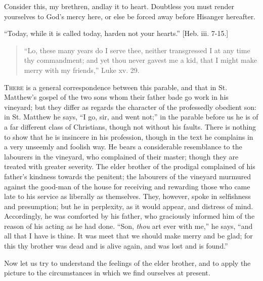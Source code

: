 Consider this, my brethren, and\emph{}lay it to heart. Doubtless
you must render yourselves to God's mercy here, or else be forced away
before His\emph{}anger hereafter.

``Today, while it is called today, harden not your
hearts.'' [Heb. iii. 7-15.]


\begin{quote}

``Lo, these many years do I serve thee, neither transgressed
I at any time thy commandment; and yet thou never gavest me a kid,
that I might make merry with my friends,'' Luke xv. 29.

\end{quote}

T\textsc{here} is a general correspondence between this parable, and that in
St. Matthew's gospel of the two sons whom their father bade go work in
his vineyard; but they differ as regards the character of the
professedly obedient son: in St. Matthew he says, ``I go, sir, and
went not;'' in the parable before us he is of a far different
class of Christians, though not without his faults. There is nothing
to show that he is insincere in his profession, though in the text he
complains in a very unseemly and foolish way. He bears a considerable
resemblance to the labourers in the vineyard, who complained of their
master; though they are treated with greater severity. The elder
brother of the prodigal complained of his father's kindness towards
the penitent; the labourers of the vineyard murmured against the
good-man of the house for receiving and rewarding those who came late
to his service as liberally as themselves. They, however, spoke in
selfishness and presumption; but he in perplexity, as it would appear,
and distress of mind. Accordingly, he was comforted by his father, who
graciously informed him of the reason of his acting as he had done.
``Son, \emph{thou} art ever with me,'' he says, ``and all
that I have is thine. It was meet that we should make merry and be
glad; for this thy brother was dead and is alive again, and was lost
and is found.''

Now let us try to understand the feelings of the elder brother, and
to apply the picture to the circumstances in which we find ourselves
at present.

